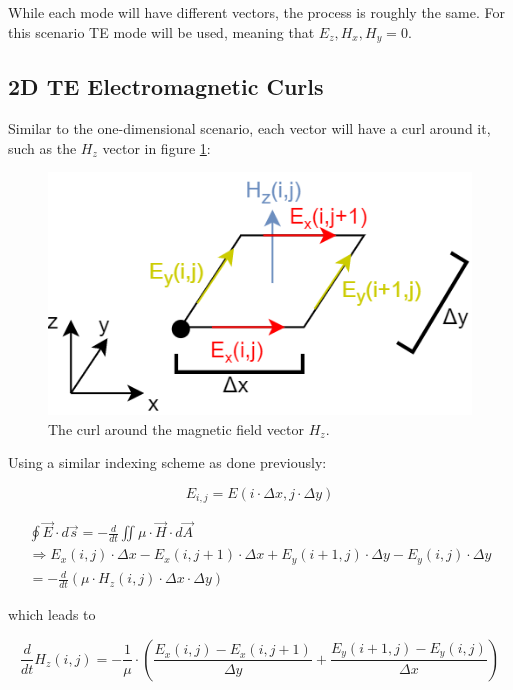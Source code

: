While each mode will have different vectors, the process is roughly the same. For this scenario TE mode will be used, meaning that $E_z, H_x, H_y = 0$.

\subsection{2D TE Electromagnetic Curls}

Similar to the one-dimensional scenario, each vector will have a curl around it, such as the $H_z$ vector in figure \ref{fig:fdtd2dHz}:

\begin{figure}[h!]
	\centering
	\includegraphics[scale=0.6]{Figures/fdtd2dHz}
	\decoRule
	\caption[2D TE Mode - $H_z$ vector curl]{The curl around the magnetic field vector $H_z$.}
	\label{fig:fdtd2dHz}
\end{figure}

Using a similar indexing scheme as done previously:

\begin{equation}
	\label{eqn:indexing2DElectric}
	E_{i,j} = E(i \cdot \Delta x , j \cdot \Delta y)
\end{equation}

\begin{multline}
	\label{eqn:2dHzCurl1}
	\oint \vec{E} \cdot d\vec{s} = - \frac{d}{dt} \iint \mu \cdot \vec{H} \cdot d\vec{A} \\
	\Rightarrow E_x(i,j) \cdot \Delta x - E_x(i,j+1) \cdot \Delta x + E_y(i+1,j) \cdot \Delta y - E_y(i,j) \cdot \Delta y \\ = -\frac{d}{dt}(\mu \cdot H_z(i,j) \cdot \Delta x \cdot \Delta y)
\end{multline}

which leads to

\begin{equation}
	\label{eqn:2dHzCurl2}
	\frac{d}{dt} H_z(i,j) = -\frac{1}{\mu} \cdot (\frac{E_x(i,j) - E_x(i,j+1)}{\Delta y} + \frac{E_y(i+1,j)- E_y(i,j)}{\Delta x})
\end{equation}

